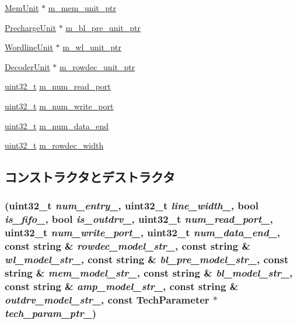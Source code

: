 \begin{DoxyCompactItemize}
\hyperlink{classMemUnit}{MemUnit} $\ast$ \hyperlink{classSRAM_ae82e83ce5d903907de04ffbb9cf0c1c4}{m\_\-mem\_\-unit\_\-ptr}
\item 
\hyperlink{classPrechargeUnit}{PrechargeUnit} $\ast$ \hyperlink{classSRAM_a8dee760fb2038ae2ac5d06bec679567b}{m\_\-bl\_\-pre\_\-unit\_\-ptr}
\item 
\hyperlink{classWordlineUnit}{WordlineUnit} $\ast$ \hyperlink{classSRAM_a88ab323dc1aabb663a49f131fd43a549}{m\_\-wl\_\-unit\_\-ptr}
\item 
\hyperlink{classDecoderUnit}{DecoderUnit} $\ast$ \hyperlink{classSRAM_af248bbf358f029f6c226068df2f12a76}{m\_\-rowdec\_\-unit\_\-ptr}
\item 
\hyperlink{Type_8hh_a435d1572bf3f880d55459d9805097f62}{uint32\_\-t} \hyperlink{classSRAM_a0bf03d796dd95afdc5077aa3a1bef997}{m\_\-num\_\-read\_\-port}
\item 
\hyperlink{Type_8hh_a435d1572bf3f880d55459d9805097f62}{uint32\_\-t} \hyperlink{classSRAM_a2c7430e3adc3731c7d4d7b23a12bc0e2}{m\_\-num\_\-write\_\-port}
\item 
\hyperlink{Type_8hh_a435d1572bf3f880d55459d9805097f62}{uint32\_\-t} \hyperlink{classSRAM_ad874cacc5e9e8f63d86abf08c6c0519d}{m\_\-num\_\-data\_\-end}
\item 
\hyperlink{Type_8hh_a435d1572bf3f880d55459d9805097f62}{uint32\_\-t} \hyperlink{classSRAM_af0ba7be4a4c39caf7f8108d89cdda070}{m\_\-rowdec\_\-width}
\end{DoxyCompactItemize}


\subsection{コンストラクタとデストラクタ}
\hypertarget{classSRAM_a44e5766c0ab3b73832cb445b67ef48ed}{
\subsubsection[{SRAM}]{ ({\bf uint32\_\-t} {\em num\_\-entry\_\-}, \/  {\bf uint32\_\-t} {\em line\_\-width\_\-}, \/  bool {\em is\_\-fifo\_\-}, \/  bool {\em is\_\-outdrv\_\-}, \/  {\bf uint32\_\-t} {\em num\_\-read\_\-port\_\-}, \/  {\bf uint32\_\-t} {\em num\_\-write\_\-port\_\-}, \/  {\bf uint32\_\-t} {\em num\_\-data\_\-end\_\-}, \/  const string \& {\em rowdec\_\-model\_\-str\_\-}, \/  const string \& {\em wl\_\-model\_\-str\_\-}, \/  const string \& {\em bl\_\-pre\_\-model\_\-str\_\-}, \/  const string \& {\em mem\_\-model\_\-str\_\-}, \/  const string \& {\em bl\_\-model\_\-str\_\-}, \/  const string \& {\em amp\_\-model\_\-str\_\-}, \/  const string \& {\em outdrv\_\-model\_\-str\_\-}, \/  const {\bf TechParameter} $\ast$ {\em tech\_\-param\_\-ptr\_\-})}}
\label{classSRAM_a44e5766c0ab3b73832cb445b67ef48ed}



